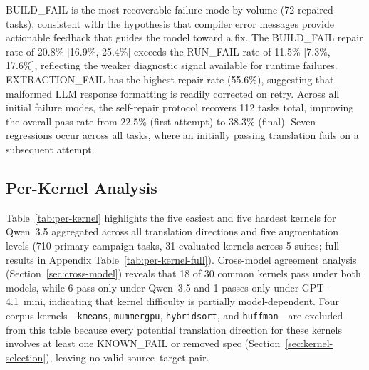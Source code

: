 \documentclass[conference]{IEEEtran}
\newcommand{\buildfail}{\textsc{BUILD\_FAIL}}
\newcommand{\runfail}{\textsc{RUN\_FAIL}}
\newcommand{\extractionfail}{\textsc{EXTRACTION\_FAIL}}
\begin{document}
\buildfail{} is the most recoverable failure mode by volume (72 repaired tasks), consistent with the hypothesis that compiler error messages provide actionable feedback that guides the model toward a fix. The \buildfail{} repair rate of 20.8\% [16.9\%, 25.4\%] exceeds the \runfail{}{} rate of 11.5\% [7.3\%, 17.6\%], reflecting the weaker diagnostic signal available for runtime failures. \extractionfail{} has the highest repair rate (55.6\%), suggesting that malformed LLM response formatting is readily corrected on retry. Across all initial failure modes, the self-repair protocol recovers 112 tasks total, improving the overall pass rate from 22.5\% (first-attempt) to 38.3\% (final). Seven regressions occur across all tasks, where an initially passing translation fails on a subsequent attempt.

\subsection{Per-Kernel Analysis}
\label{sec:per-kernel}

Table~\ref{tab:per-kernel} highlights the five easiest and five hardest kernels for Qwen~3.5 aggregated across all translation directions and five augmentation levels (710 primary campaign tasks, 31 evaluated kernels across 5 suites; full results in Appendix Table~\ref{tab:per-kernel-full}). Cross-model agreement analysis (Section~\ref{sec:cross-model}) reveals that 18 of 30 common kernels pass under both models, while 6 pass only under Qwen~3.5 and 1 passes only under GPT-4.1~mini, indicating that kernel difficulty is partially model-dependent. %
Four corpus kernels---\texttt{kmeans}, \texttt{mummergpu}, \texttt{hybridsort}, and \texttt{huffman}---are excluded from this table because every potential translation direction for these kernels involves at least one KNOWN\_FAIL or removed spec (Section~\ref{sec:kernel-selection}), leaving no valid source--target pair.
\end{document}
